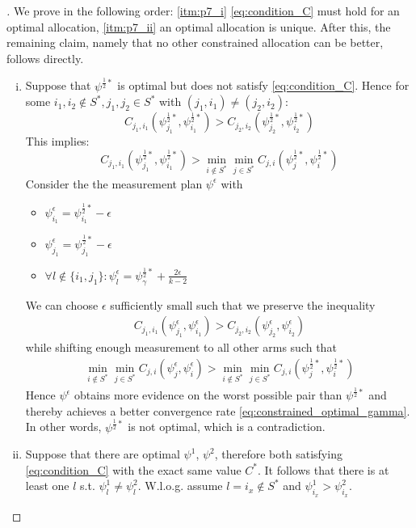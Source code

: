 \begin{proof}[]
  We prove in the following order: \eqref{itm:p7_i} \eqref{eq:condition_C} must
  hold for an optimal allocation, \eqref{itm:p7_ii} an optimal allocation is
  unique. After this, the remaining claim, namely that no other constrained
  allocation can be better, follows directly.
  \begin{enumerate}[(i)]
    \item \label{itm:p7_i} Suppose that $\psi^{\frac{1}{2}*}$ is optimal but does not satisfy \eqref{eq:condition_C}. Hence for some $i_1, i_2 \notin S^*, j_1, j_2 \in S^*$ with $(j_1, i_1) \neq (j_2, i_2)$:
    \[C_{j_1, i_1}(\psi^{\frac{1}{2}*}_{j_1}, \psi^{\frac{1}{2}*}_{i_1}) > C_{j_2, i_2}(\psi^{\frac{1}{2}*}_{j_2}, \psi^{\frac{1}{2}*}_{i_2})\]
    This implies:
    \[C_{j_1, i_1}(\psi^{\frac{1}{2}*}_{j_1}, \psi^{\frac{1}{2}*}_{i_1}) > \min_{i \notin S^*} \min_{j \in S^*}C_{j, i}(\psi^{\frac{1}{2}*}_j, \psi^{\frac{1}{2}*}_i) \]
    Consider the the measurement plan $\psi^\epsilon$ with
    \begin{itemize}
      \item $\psi^\epsilon_{i_1} = \psi^{\frac{1}{2}*}_{i_1} - \epsilon$
      \item $\psi^\epsilon_{j_1} = \psi^{\frac{1}{2}*}_{j_1} - \epsilon$
      \item $\forall l\notin \{i_1, j_1\}: \psi^\epsilon_l = \psi^{\frac{1}{2}*}_\gamma + \frac{2 \epsilon}{k-2}$
    \end{itemize}
    We can choose $\epsilon$ sufficiently small such that we preserve the inequality
    \begin{align}
      C_{j_1, i_1}(\psi^\epsilon_{j_1}, \psi^\epsilon_{i_1}) > C_{j_2, i_2}(\psi^\epsilon_{j_2}, \psi^\epsilon_{i_2})
    \end{align}
    while shifting enough measurement to all other arms such that
    \begin{align}
      \min_{i \notin S^*} \min_{j \in S^*} C_{j, i}(\psi^\epsilon_{j}, \psi^\epsilon_i) > \min_{i \notin S^*} \min_{j \in S^*} C_{j, i}(\psi^{\frac{1}{2}*}_j, \psi^{\frac{1}{2}*}_i)
    \end{align}
    Hence $\psi^\epsilon$ obtains more evidence on the worst possible pair than
    $\psi^{\frac{1}{2}*}$ and thereby achieves a better convergence rate
    \eqref{eq:constrained_optimal_gamma}. In other words, $\psi^{\frac{1}{2}*}$
    is not optimal, which is a contradiction.

    \item \label{itm:p7_ii} Suppose that there are optimal $\psi^1$, $\psi^2$,
    therefore both satisfying \eqref{eq:condition_C} with the exact same value
    $C^*$. It follows that there is at least one $l$ s.t. $\psi^1_{l} \neq
    \psi^2_{l}$. W.l.o.g. assume $l = i_x \notin S^*$ and $\psi^1_{i_x} >
    \psi^2_{i_x}$.


\end{enumerate}
\end{proof}
